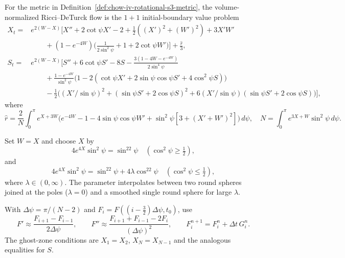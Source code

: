 \begin{proposition}
\label{prop:chow-iv-numerical-deturck-equations}


For the metric in Definition~\ref{def:chow-iv-rotational-s3-metric}, the
volume-normalized Ricci--DeTurck flow is the $1+1$ initial-boundary value
problem
\begin{align*}
 X_t={}&e^{2(W-X)}\!\bigl[X''+2\cot\psi X'-2+\tfrac12((X')^2+(W')^2)
 +3X'W' \\[-2pt]
 &\qquad +(1-e^{-4W})\bigl(\tfrac1{2\sin^2\psi}+1+2\cot\psi W'\bigr)\bigr]
 +\tfrac{\hat r}{3},\\
 S_t={}&e^{2(W-X)}\!\bigl[S''+6\cot\psi S'-8S
 -\frac{3(1-4W-e^{-4W})}{2\sin^4\psi}\\[-2pt]
 &\qquad+\frac{1-e^{-4W}}{\sin^2\psi}
 \bigl(1-2(\cot\psi X'+2\sin\psi\cos\psi S'+4\cos^2\psi S)\bigr)\\[-2pt]
 &\qquad-\tfrac12\bigl((X'/\sin\psi)^2+(\sin\psi S'+2\cos\psi S)^2
 +6(X'/\sin\psi)(\sin\psi S'+2\cos\psi S)\bigr)\bigr],
\end{align*}
where
\[
 \hat r=\frac2N\int_0^\pi e^{X+3W}\bigl(e^{-4W}-1-4\sin\psi\cos\psi W'
 +\sin^2\psi[3+(X'+W')^2]\bigr)\,d\psi,
 \quad N=\int_0^\pi e^{3X+W}\sin^2\psi\,d\psi.
\]
\end{proposition}

\begin{definition}
\label{def:chow-iv-lambda-neckpinch-data}

Set $W=X$ and choose $X$ by
\[
4e^{4X}\sin^2\psi=\sin^22\psi\quad(\cos^2\psi\ge\tfrac12),
\]
and
\[
4e^{4X}\sin^2\psi=\sin^22\psi+4\lambda\cos^22\psi
 \quad(\cos^2\psi\le\tfrac12),
\]
where $\lambda\in(0,\infty)$.  The parameter interpolates between two
round spheres joined at the poles ($\lambda=0$) and a smoothed single round
 sphere for large $\lambda$.
\end{definition}

\begin{definition}
\label{def:chow-iv-finite-difference-scheme}

With $\Delta\psi=\pi/(N-2)$ and
$F_i=F((i-\tfrac32)\Delta\psi,t_0)$, use
\[
 F'\approx\frac{F_{i+1}-F_{i-1}}{2\Delta\psi},\qquad
 F''\approx\frac{F_{i+1}+F_{i-1}-2F_i}{(\Delta\psi)^2},\qquad
 F_i^{n+1}=F_i^n+\Delta t\,G_i^n.
\]
The ghost-zone conditions are $X_1=X_2$, $X_N=X_{N-1}$ and the analogous
equalities for $S$.
\end{definition}

